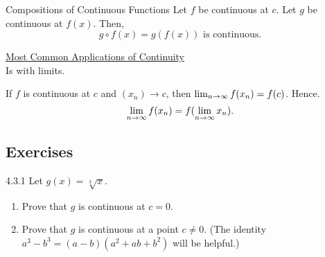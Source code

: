 \begin{ntheorem}
    {Compositions of Continuous Functions} Let \(f\) be continuous at \(c\). Let \(g\) be continuous at \(f(x)\). Then,
    \[
        g \circ f(x) = g(f(x)) \text{ is continuous.}
    \]
\end{ntheorem}


\begin{center}
    \underline{Most Common Applications of Continuity} \\

    Is with limits.
\end{center}

If \(f\) is continuous at \(c\) and \((x_n) \to c\), then \(\lim_{n \rightarrow \infty}f(x_n) = f(c)\). Hence.
\[
    \lim_{n \rightarrow \infty}f(x_n) = f(\lim_{n \rightarrow \infty}x_n).
\]

\renewcommand{\theenumi}{\alph{enumi}}
\renewcommand{\labelenumi}{(\theenumi)}
\subsection{Exercises}

\begin{exercise}
    {4.3.1} Let \( g(x) = \sqrt[3]{x} \).
    \begin{enumerate}
        \item Prove that \( g \) is continuous at \( c = 0 \).
        \item Prove that \( g \) is continuous at a point \( c \neq 0 \). (The identity \( a^3 - b^3 = (a - b)(a^2 + ab + b^2) \) will be helpful.)
    \end{enumerate}
\end{exercise}

